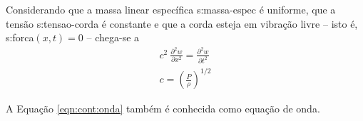 \documentclass[12pt,openright,oneside,a4paper,
	chapter=TITLE,section=TITLE,
	english,brazil]{abntex2}
\begin{document}
	Considerando que a massa linear específica \gls{s:massa-espec} é uniforme, que a tensão \gls{s:tensao-corda} é constante e que a corda esteja em vibração livre -- isto é, \gls{s:forca}$(x,t) = 0$ -- chega-se a \cite{rao:2008}
	\begin{align}
		\mathit{c}^2\:\frac{\partial^2 w}{\partial x^2}=\frac{\partial^2 w}{\partial t^2} \label{eqn:cont:onda}\\
		\mathit{c} = \left(\frac{P}{\rho}\right)^{1/2}
	\end{align}
	
	A Equação \ref{eqn:cont:onda} também é conhecida como equação de onda. 
	
%
\end{document}
